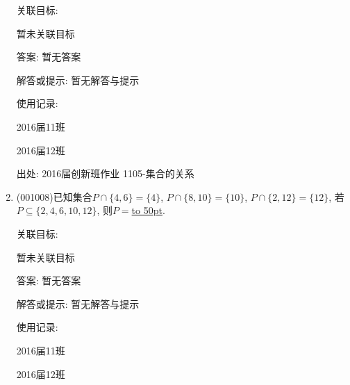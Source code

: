 \documentclass[10pt,a4paper]{article}
\newcommand{\blank}[1]{\underline{\hbox to #1pt{}}}
\begin{document}
\begin{enumerate}[1.]
关联目标:

暂未关联目标

答案: 暂无答案

解答或提示: 暂无解答与提示

使用记录:

2016届11班	

2016届12班	


出处: 2016届创新班作业	1105-集合的关系
\item { (001008)}已知集合$P\cap\{4,6\}=\{4\}$, $P\cap\{8,10\}=\{10\}$, $P\cap\{2,12\}=\{12\}$,
若$P\subseteq\{2,4,6,10,12\}$, 则$P=$\blank{50}.


关联目标:

暂未关联目标

答案: 暂无答案

解答或提示: 暂无解答与提示

使用记录:

2016届11班	

2016届12班	



\end{enumerate}
\end{document}
